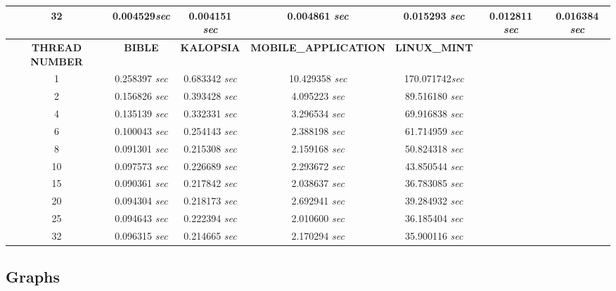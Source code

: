 \begin{sidewaystable}[h]
\begin{tabular}{|c|c|c|c|c|c|c|}
\hline \rule[-2ex]{0pt}{4.5ex}  32 & 0.004529\textit{sec}& 0.004151 \textit{sec} & 0.004861 \textit{sec} & 0.015293 \textit{sec} & 0.012811 \textit{sec} & 0.016384 \textit{sec} \\
\hline 
\hline
\hline \rule[-2ex]{0pt}{4.5ex} {\small \textbf{THREAD NUMBER}}& {\small \textbf{BIBLE} }& {\small \textbf{KALOPSIA}} & {\small \textbf{MOBILE\_APPLICATION}} & {\small\textbf{LINUX\_MINT}} & & \\
\hline \rule[-2ex]{0pt}{4.5ex} 1 & 0.258397 \textit{sec} & 0.683342 \textit{sec} & 10.429358 \textit{sec}& 170.071742\textit{sec} &  &      \\
\hline \rule[-2ex]{0pt}{4.5ex} 2 & 0.156826 \textit{sec} & 0.393428 \textit{sec} & 4.095223 \textit{sec} & 89.516180 \textit{sec} &  &     \\ 
\hline \rule[-2ex]{0pt}{4.5ex} 4 & 0.135139 \textit{sec} & 0.332331 \textit{sec} & 3.296534 \textit{sec} & 69.916838 \textit{sec} &  &      \\ 
\hline \rule[-2ex]{0pt}{4.5ex} 6 & 0.100043 \textit{sec} & 0.254143 \textit{sec} & 2.388198 \textit{sec} & 61.714959 \textit{sec} &  &      \\ 
\hline \rule[-2ex]{0pt}{4.5ex} 8 & 0.091301 \textit{sec} & 0.215308 \textit{sec} & 2.159168 \textit{sec} & 50.824318 \textit{sec} &  &      \\ 
\hline \rule[-2ex]{0pt}{4.5ex} 10 & 0.097573 \textit{sec}& 0.226689 \textit{sec} & 2.293672 \textit{sec} & 43.850544 \textit{sec} &  &     \\ 
\hline \rule[-2ex]{0pt}{4.5ex} 15 & 0.090361 \textit{sec}& 0.217842 \textit{sec} & 2.038637 \textit{sec} & 36.783085 \textit{sec} &  &     \\ 
\hline \rule[-2ex]{0pt}{4.5ex} 20 & 0.094304 \textit{sec}& 0.218173 \textit{sec} & 2.692941 \textit{sec} & 39.284932 \textit{sec} &  &     \\ 
\hline \rule[-2ex]{0pt}{4.5ex} 25 & 0.094643 \textit{sec}& 0.222394 \textit{sec} & 2.010600 \textit{sec} & 36.185404 \textit{sec} &  &    \\ 
\hline \rule[-2ex]{0pt}{4.5ex} 32 & 0.096315 \textit{sec}& 0.214665 \textit{sec} & 2.170294 \textit{sec} & 35.900116 \textit{sec} &  &     \\
\hline


\end{tabular}


\end{sidewaystable}
\clearpage
\subsection{Graphs}

